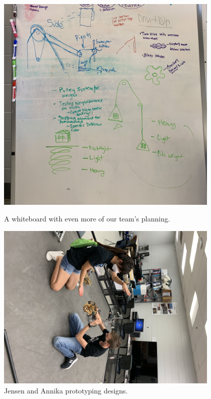 \begin{figure}[ht]
\centering
\begin{minipage}[b]{.48\textwidth}
  \centering
  \includegraphics[width=0.95\textwidth]{Meetings/September/09-21-21/9-19-21_Team_Image5 - Nathan Forrer.JPG}
  \caption{A whiteboard with even more of our team's planning.}
  \label{fig:092122_5}
\end{minipage}%
\hfill%
\begin{minipage}[b]{.48\textwidth}
  \centering
  \includegraphics[width=0.95\textwidth]{Meetings/September/09-21-21/9-19-21_Team_Image6 - Nathan Forrer.JPG}
  \caption{Jensen and Annika prototyping designs.}
  \label{fig:092122_6}
\end{minipage}
\end{figure}

